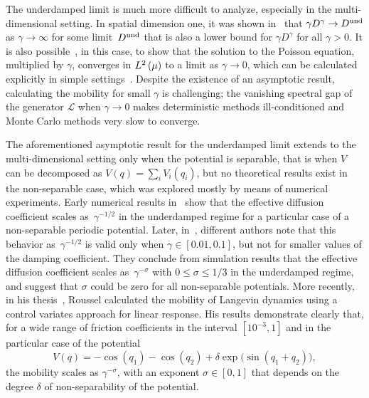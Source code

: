 \documentclass[11pt,a4paper]{article}
\theoremstyle{plain}
\numberwithin{equation}{section}
\renewcommand{\leq}{\leqslant}
\begin{document}
The underdamped limit is much more difficult to analyze,
especially in the multi-dimensional setting.
In spatial dimension one, it was shown in~\cite{MR2394704} that $\gamma D^{\gamma} \to D^{\rm und}$ as $\gamma \to \infty$ for some limit~$D^{\rm und}$
that is also a lower bound for $\gamma D^{\gamma}$ for all $\gamma > 0$.
It is also possible~\cite[Lemma 3.4]{MR2394704}, in this case,
to show that the solution to the Poisson equation,
multiplied by $\gamma$, converges in $\lp{2}{\mu}$ to a limit as $\gamma \to 0$,
which can be calculated explicitly in simple settings~\cite{MR2427108}.
Despite the existence of an asymptotic result,
calculating the mobility for small $\gamma$ is challenging;
the vanishing spectral gap of the generator $\mathcal L$ when $\gamma \to 0$ makes deterministic methods ill-conditioned
and Monte Carlo methods very slow to converge.

The aforementioned asymptotic result for the underdamped limit extends to the multi-dimensional setting only when the potential is separable,
that is when $V$ can be decomposed as $V(q) = \sum_i V_i(q_i)$,
but no theoretical results exist in the non-separable case,
which was explored mostly by means of numerical experiments.
Early numerical results in~\cite{chen1996surface} show that the effective diffusion coefficient scales as~$\gamma^{-1/2}$ in the underdamped regime for a particular case of a non-separable periodic potential.
Later, in~\cite{Braun02},
different authors note that this behavior as~$\gamma^{-1/2}$ is valid only when $\gamma \in [0.01, 0.1]$,
but not for smaller values of the damping coefficient.
They conclude from simulation results that the effective diffusion coefficient scales as~$\gamma^{-\sigma}$ with $0 \leq \sigma \leq 1/3$ in the underdamped regime,
and suggest that $\sigma$ could be zero for all non-separable potentials.
More recently, in his thesis~\cite{roussel_thesis},
Roussel calculated the mobility of Langevin dynamics  using a control variates approach for linear response.
His results demonstrate clearly that, for a wide range of friction coefficients in the interval $[10^{-3}, 1]$
and in the particular case of the potential
\begin{equation}
    \label{eq:potential_julien}
    V(q) = - \cos(q_1) - \cos(q_2) + \delta \exp \bigl(\sin(q_1 + q_2)\bigr),
\end{equation}
the mobility scales as $\gamma^{- \sigma}$,
with an exponent $\sigma \in [0, 1]$ that depends on the degree $\delta$ of non-separability of the potential.
\end{document}
